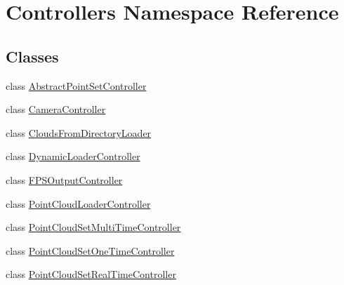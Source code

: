 \hypertarget{namespace_controllers}{}\section{Controllers Namespace Reference}
\label{namespace_controllers}
\subsection*{Classes}
\begin{DoxyCompactItemize}
\item 
class \hyperlink{class_controllers_1_1_abstract_point_set_controller}{Abstract\+Point\+Set\+Controller}
\item 
class \hyperlink{class_controllers_1_1_camera_controller}{Camera\+Controller}
\item 
class \hyperlink{class_controllers_1_1_clouds_from_directory_loader}{Clouds\+From\+Directory\+Loader}
\item 
class \hyperlink{class_controllers_1_1_dynamic_loader_controller}{Dynamic\+Loader\+Controller}
\item 
class \hyperlink{class_controllers_1_1_f_p_s_output_controller}{F\+P\+S\+Output\+Controller}
\item 
class \hyperlink{class_controllers_1_1_point_cloud_loader_controller}{Point\+Cloud\+Loader\+Controller}
\item 
class \hyperlink{class_controllers_1_1_point_cloud_set_multi_time_controller}{Point\+Cloud\+Set\+Multi\+Time\+Controller}
\item 
class \hyperlink{class_controllers_1_1_point_cloud_set_one_time_controller}{Point\+Cloud\+Set\+One\+Time\+Controller}
\item 
class \hyperlink{class_controllers_1_1_point_cloud_set_real_time_controller}{Point\+Cloud\+Set\+Real\+Time\+Controller}
\end{DoxyCompactItemize}
